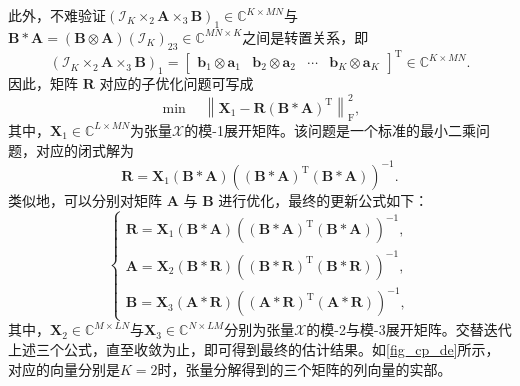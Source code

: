 此外，不难验证\( (\mathcal{I}_K \times_2 \mathbf{A} \times_3 \mathbf{B})_1 \in \mathbb{C}^{K \times M N} \)与\( \mathbf{B} \ast  \mathbf{A} = (\mathbf{B} \otimes \mathbf{A}) (\mathcal{I}_K)_{23} \in \mathbb{C}^{M N \times K} \)之间是转置关系，即
\[
    (\mathcal{I}_K \times_2 \mathbf{A} \times_3 \mathbf{B})_{1} = \begin{bmatrix}
        \bm{b}_1 \otimes \bm{a}_1 & \bm{b}_2 \otimes \bm{a}_2 & \cdots & \bm{b}_K \otimes \bm{a}_K
    \end{bmatrix}^{\mathrm{T}} \in \mathbb{C}^{K \times M N}.
\]
因此，矩阵 \( \mathbf{R} \) 对应的子优化问题可写成
\[
    \min \quad \left\| \mathbf{X}_{1} - \mathbf{R} (\mathbf{B} \ast  \mathbf{A})^{\mathrm{T}} \right\|_{\mathrm{F}}^2,
\]
其中，\( \mathbf{X}_{1} \in \mathbb{C}^{L \times M N} \)为张量\( \mathcal{X} \)的模-1展开矩阵。该问题是一个标准的最小二乘问题，对应的闭式解为
\[
    \mathbf{R} = \mathbf{X}_{1} (\mathbf{B} \ast  \mathbf{A}) \left( (\mathbf{B} \ast  \mathbf{A})^{\mathrm{T}} (\mathbf{B} \ast  \mathbf{A}) \right)^{-1}.
\]
类似地，可以分别对矩阵 \( \mathbf{A} \) 与 \( \mathbf{B} \) 进行优化，最终的更新公式如下：
\[
    \begin{cases}
        \mathbf{R} = \mathbf{X}_{1} (\mathbf{B} \ast  \mathbf{A}) \left( (\mathbf{B} \ast  \mathbf{A})^{\mathrm{T}} (\mathbf{B} \ast  \mathbf{A}) \right)^{-1}, \\
        \mathbf{A} = \mathbf{X}_{2} (\mathbf{B} \ast \mathbf{R}) \left( (\mathbf{B} \ast \mathbf{R})^{\mathrm{T}} (\mathbf{B} \ast  \mathbf{R}) \right)^{-1},   \\
        \mathbf{B} = \mathbf{X}_{3} (\mathbf{A} \ast  \mathbf{R}) \left( (\mathbf{A} \ast  \mathbf{R})^{\mathrm{T}} (\mathbf{A} \ast  \mathbf{R}) \right)^{-1},
    \end{cases}
\]
其中，\( \mathbf{X}_{2} \in \mathbb{C}^{M \times L N} \)与\( \mathbf{X}_{3} \in \mathbb{C}^{N \times L M} \)分别为张量\( \mathcal{X} \)的模-2与模-3展开矩阵。交替迭代上述三个公式，直至收敛为止，即可得到最终的估计结果。如\cref{fig_cp_de}所示，对应的向量分别是\( K=2 \)时，张量分解得到的三个矩阵的列向量的实部。
